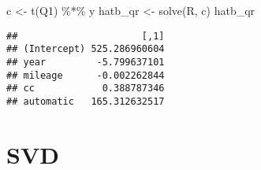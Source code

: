 \documentclass[
]{book}
\newenvironment{Shaded}{\begin{snugshade}}{\end{snugshade}}
\newcommand{\FunctionTok}[1]{\textcolor[rgb]{0.00,0.00,0.00}{#1}}
\newcommand{\NormalTok}[1]{#1}
\newcommand{\OtherTok}[1]{\textcolor[rgb]{0.56,0.35,0.01}{#1}}
\newcommand{\SpecialCharTok}[1]{\textcolor[rgb]{0.00,0.00,0.00}{#1}}
\begin{document}
\begin{Shaded}
\begin{Highlighting}[]
\NormalTok{c }\OtherTok{\textless{}{-}} \FunctionTok{t}\NormalTok{(Q1) }\SpecialCharTok{\%*\%}\NormalTok{ y}
\NormalTok{hatb\_qr }\OtherTok{\textless{}{-}} \FunctionTok{solve}\NormalTok{(R, c)}
\NormalTok{hatb\_qr}
\end{Highlighting}
\end{Shaded}

\begin{verbatim}
##                      [,1]
## (Intercept) 525.286960604
## year         -5.799637101
## mileage      -0.002262844
## cc            0.388787346
## automatic   165.312632517
\end{verbatim}

\hypertarget{svd}{%
\section{SVD}\label{svd}}

\begin{Shaded}
\end{Shaded}
\end{document}
